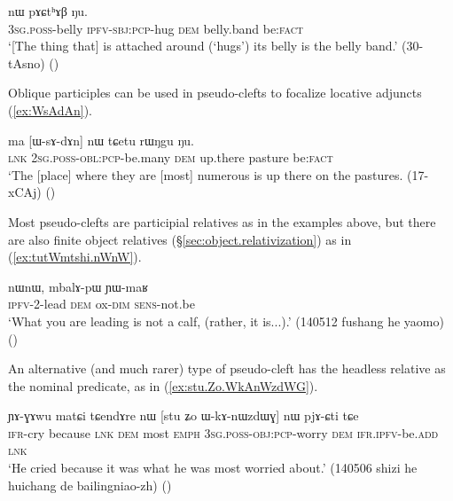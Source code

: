 \begin{exe}
\ex \label{ex:tukWrqoR}
 nɯ pɤɕtʰɤβ ŋu. \\
\textsc{3sg}.\textsc{poss}-belly \textsc{ipfv}-\textsc{sbj}:\textsc{pcp}-hug \textsc{dem} belly.band be:\textsc{fact} \\
\glt `[The thing that] is attached around (`hugs') its belly is the belly band.' (30-tAsno)
()
 \end{exe}
 
Oblique participles can be used in pseudo-clefts to focalize locative adjuncts (\ref{ex:WsAdAn}).
 
\begin{exe}
\ex \label{ex:WsAdAn}
\gll  ma [ɯ-sɤ-dɤn] nɯ tɕetu rɯŋgu ŋu. \\
\textsc{lnk} \textsc{2sg}.\textsc{poss}-\textsc{obl}:\textsc{pcp}-be.many \textsc{dem} up.there pasture be:\textsc{fact} \\
\glt `The [place] where they are [most] numerous is up there on the pastures. (17-xCAj)
()
\end{exe}

 Most pseudo-clefts are participial relatives as in the examples above, but there are also finite object relatives (§\ref{sec:object.relativization}) as in (\ref{ex:tutWmtshi.nWnW}).
 
\begin{exe}
\ex \label{ex:tutWmtshi.nWnW}
\gll  [tu-tɯ-mtsʰi] nɯnɯ, mbalɤ-pɯ ɲɯ-maʁ \\
\textsc{ipfv}-2-lead \textsc{dem} ox-\textsc{dim} \textsc{sens}-not.be \\
\glt `What you are leading is not a calf, (rather, it is...).' (140512 fushang he yaomo)
()
\end{exe}

An alternative (and much rarer) type of pseudo-cleft has the headless relative as the nominal predicate, as in (\ref{ex:stu.Zo.WkAnWzdWG}).

\begin{exe}
\ex \label{ex:stu.Zo.WkAnWzdWG}
\gll ɲɤ-ɣɤwu matɕi tɕendɤre nɯ [stu ʑo ɯ-kɤ-nɯzdɯɣ] nɯ pjɤ-ɕti tɕe  \\
\textsc{ifr}-cry because \textsc{lnk} \textsc{dem} most \textsc{emph} \textsc{3sg}.\textsc{poss}-\textsc{obj}:\textsc{pcp}-worry \textsc{dem} \textsc{ifr}.\textsc{ipfv}-be.\textsc{add} \textsc{lnk} \\
\glt `He cried because it was what he was most worried about.' (140506 shizi he huichang de bailingniao-zh)
()
\end{exe}
 
